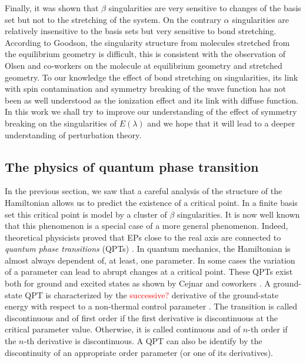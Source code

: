 \documentclass[11pt,a4paper]{article}
\newcommand{\titou}[1]{\textcolor{red}{#1}}
\begin{document}
Finally, it was shown that $\beta$ singularities are very sensitive to changes of the basis set but not to the stretching of the system. On the contrary $\alpha$ singularities are relatively insensitive to the basis sets but very sensitive to bond stretching. According to Goodson, \cite{Goodson_2004} the singularity structure from molecules stretched from the equilibrium geometry is difficult, this is consistent with the observation of Olsen and co-workers  \cite{Olsen_2000} on the  molecule at equilibrium geometry and stretched geometry. To our knowledge the effect of bond stretching on singularities, its link with spin contamination and symmetry breaking of the wave function has not been as well understood as the ionization effect and its link with diffuse function. In this work we shall try to improve our understanding of the effect of symmetry breaking on the singularities of $E(\lambda)$ and we hope that it will lead to a deeper understanding of perturbation theory.

\subsection{The physics of quantum phase transition}

In the previous section, we saw that a careful analysis of the structure of the Hamiltonian allows us to predict the existence of a critical point. In a finite basis set this critical point is model by a cluster of $\beta$ singularities. It is now well known that this phenomenon is a special case of a more general phenomenon. Indeed, theoretical physicists proved that EPs close to the real axis are connected to \textit{quantum phase transitions} (QPTs) \cite{Heiss_1988, Heiss_2002, Cejnar_2005, Cejnar_2007, Cejnar_2009, Borisov_2015, Sindelka_2017}. In quantum mechanics, the Hamiltonian is almost always dependent of, at least, one parameter. In some cases the variation of a parameter can lead to abrupt changes at a critical point. These QPTs exist both for ground and excited states as shown by Cejnar and coworkers \cite{Cejnar_2009, Sachdev_2011, Cejnar_2015, Cejnar_2016, Caprio_2008, Macek_2019}. A ground-state QPT is characterized by the \titou{successive?} derivative of the ground-state energy with respect to a non-thermal control parameter \cite{Cejnar_2009, Sachdev_2011}. The transition is called discontinuous and of first order if the first derivative is discontinuous at the critical parameter value. Otherwise, it is called continuous and of $n$-th order if the $n$-th derivative is discontinuous. A QPT can also be identify by the discontinuity of an appropriate order parameter (or one of its derivatives). 
\end{document}
